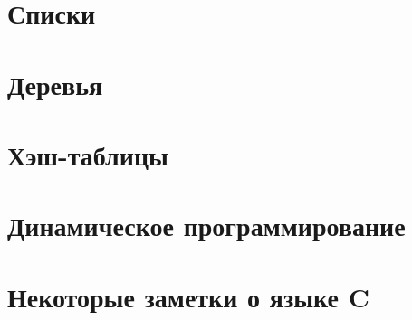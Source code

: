 \section{Списки}
\label{sec:lists}
\section{Деревья}
\label{sec:trees}
\section{Хэш-таблицы}
\label{sec:hash-tables}
\section{Динамическое программирование}
\label{sec:dyn-programming}
\section{Некоторые заметки о языке C}
\label{sec:c-notes}
